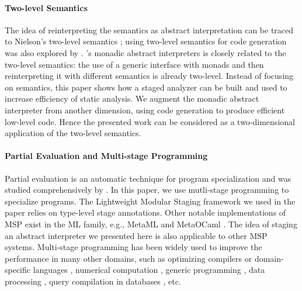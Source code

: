 \paragraph{Two-level Semantics} The idea of reinterpreting the semantics as
abstract interpretation can be traced to Nielson's two-level semantics
\cite{NIELSON1989117}; using two-level semantics for code generation
was also explored by \citet{NIELSON198859}.
\citet{Sergey:2013:MAI:2491956.2491979}'s monadic abstract
interpreters is closely related to the two-level semantics: the
use of a generic interface with monads and then reinterpreting it with
different semantics is already two-level. Instead of focusing on
semantics, this paper shows how a staged analyzer can be built and
used to increase efficiency of static analysis. We augment the monadic
abstract interpreter from another dimension, using code generation to
produce efficient low-level code. Hence the presented work can be
considered as a two-dimensional application of the two-level semantics.

\paragraph{Partial Evaluation and Multi-stage Programming}
Partial evaluation is an automatic technique for program
specialization and was studied comprehensively by
\citet{10.1007/3-540-61580-6_11, DBLP:books/daglib/0072559}. 
In this paper, we use mutli-stage programming to specialize programs.
The Lightweight Modular Staging framework
\cite{DBLP:conf/gpce/RompfO10} we used in the paper relies on
type-level stage annotations.  Other notable implementations of MSP
exist in the ML family, e.g., MetaML \cite{DBLP:conf/pepm/TahaS97} and
MetaOCaml \cite{DBLP:conf/gpce/CalcagnoTHL03,
  DBLP:conf/flops/Kiselyov14}.  
The idea of staging an abstract interpreter we presented here 
is also applicable to other MSP systems.  
Multi-stage programming has been widely used to improve the
performance in many other domains, such as optimizing compilers or
domain-specific languages \cite{DBLP:conf/pldi/RompfSBLCO14,
  DBLP:conf/snapl/RompfBLSJAOSKDK15,
  DBLP:journals/tecs/SujeethBLRCOO14, DBLP:conf/gpce/SujeethGBLROO13,
  DBLP:journals/jfp/CaretteKS09}, numerical computation \cite{PGL-038,
  DBLP:conf/pepm/AktemurKKS13}, generic programming
\cite{DBLP:journals/pacmpl/Yallop17,
  Ofenbeck:2017:SGP:3136040.3136060}, data processing
\cite{DBLP:conf/oopsla/JonnalageddaCSRO14,
  DBLP:conf/popl/KiselyovBPS17}, query compilation in databases
\cite{DBLP:conf/osdi/EssertelTDBOR18, DBLP:conf/sigmod/TahboubER18},
etc.

